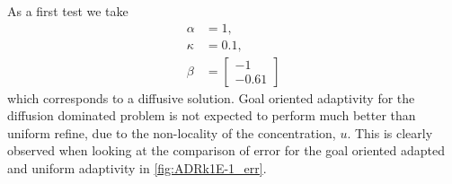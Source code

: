 \begin{test}[Diffusion Dominated ADR, $\kappa = 0.1$] \label{tst:ADRk1E-1}
    As a first test we take
    \begin{align*}
        \alpha &= 1, \\
        \kappa &= 0.1, \\
        \beta &= \begin{bmatrix} -1 \\ -0.61 \end{bmatrix}
    \end{align*}
    which corresponds to a diffusive solution. Goal oriented adaptivity for
    the diffusion dominated problem is not expected to perform much better than
    uniform refine, due to the non-locality of the concentration, $u$. This is
    clearly observed when looking at the comparison of error for the goal
    oriented adapted and uniform adaptivity in \autoref{fig:ADRk1E-1_err}.
    \begin{figure}[h]
        \centering
        \begin{minipage}[t]{0.49\textwidth}
            \centering
\end{minipage}
\end{figure}
\end{test}
